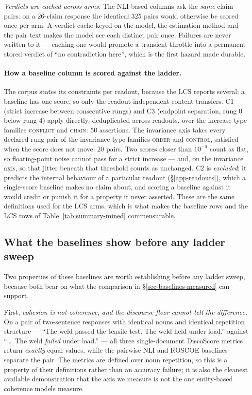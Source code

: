 \emph{Verdicts are cached across arms.} The NLI-based columns ask the \emph{same} claim pairs: on a
$26$-claim response the identical $325$ pairs would otherwise be scored once per arm. A verdict cache
keyed on the model, the estimation method and the pair text makes the model see each distinct pair
once. Failures are never written to it --- caching one would promote a transient throttle into a
permanent stored verdict of ``no contradiction here'', which is the first hazard made durable.

\paragraph{How a baseline column is scored against the ladder.} The corpus states its constraints per
readout, because the LCS reports several; a baseline has one score, so only the readout-independent
content transfers. C1 (strict increase between consecutive rungs) and C3 (endpoint separation, rung
$0$ below rung $4$) apply directly, deduplicated across readouts, over the increase-type families
\textsc{conflict} and \textsc{chain}: $50$ assertions. The invariance axis takes every declared rung
pair of the invariance-type families \textsc{order} and \textsc{control}, satisfied when the score does
not move: $20$ pairs. Two scores closer than $10^{-6}$ count as flat, so floating-point noise cannot
pass for a strict increase --- and, on the invariance axis, so that jitter beneath that threshold
counts as unchanged. C2 is \emph{excluded}: it predicts the internal behaviour of a particular readout
(\S\ref{app-readouts}), which a single-score baseline makes no claim about, and scoring a baseline
against it would credit or punish it for a property it never asserted. These are the same definitions
used for the LCS arms, which is what makes the baseline rows and the LCS rows of
Table~\ref{tab:summary-mined} commensurable.


\subsection{What the baselines show before any ladder sweep}
\label{app-baseline-prior}

Two properties of these baselines are worth establishing before any ladder sweep, because both bear
on what the comparison in \S\ref{sec-baselines-measured} can support.

First, \emph{cohesion is not coherence, and the discourse floor cannot tell the difference.} On a pair
of two-sentence responses with identical nouns and identical repetition structure --- ``The weld passed
the tensile test. The weld held under load.'' against ``\dots\ The weld \emph{failed} under load.'' ---
all three single-document DiscoScore metrics return \emph{exactly} equal values, while the pairwise-NLI
and ROSCOE baselines separate the pair. The metrics are defined over noun repetition, so this is a
property of their definitions rather than an accuracy failure; it is also the cleanest available
demonstration that the axis we measure is not the one entity-based coherence models measure.

